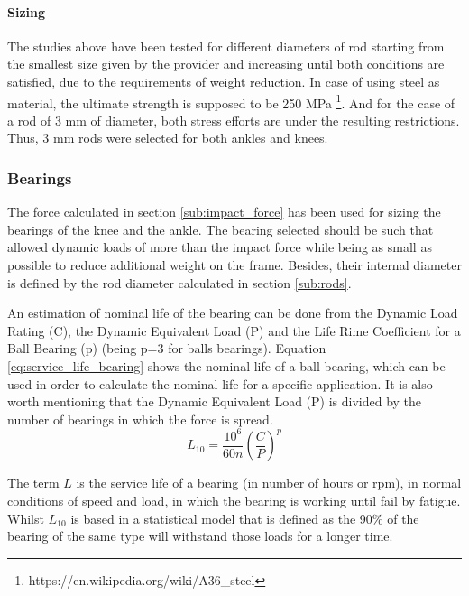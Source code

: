   \paragraph{Sizing} %
  \label{ssub:sizing}
  The studies above have been tested for different diameters of rod starting from the smallest size given by the provider and increasing until both conditions are satisfied, due to the requirements of weight reduction.
  In case of using steel as material, the ultimate strength is supposed to be 250 MPa \footnote{https://en.wikipedia.org/wiki/A36\_steel}.
  And for the case of a rod of 3 mm of diameter, both stress efforts are under the resulting restrictions.
  Thus, 3 mm rods were selected for both ankles and knees.

\subsubsection{Bearings} %
\label{ssub:bearings}
The force calculated in section \ref{sub:impact_force} has been used for sizing the bearings of the knee and the ankle.
The bearing selected should be such that allowed dynamic loads of more than the impact force while being as small as possible to reduce additional weight on the frame.
Besides, their internal diameter is defined by the rod diameter calculated in section \ref{sub:rods}.

An estimation of nominal life of the bearing can be done from the Dynamic Load Rating (C), the Dynamic Equivalent Load (P) and the Life Rime Coefficient for a Ball Bearing (p) (being p=3 for balls bearings).
Equation \ref{eq:service_life_bearing} shows the nominal life of a ball bearing, which can be used in order to calculate the nominal life for a specific application.
It is also worth mentioning that the Dynamic Equivalent Load (P) is divided by the number of bearings in which the force is spread.
\begin{equation}
  \label{eq:service_life_bearing}
  L_{10} = \frac{10^{6}}{60 n} \left(\frac{C}{P}\right)^{p}
\end{equation}

The term $L$ is the service life of a bearing (in number of hours or rpm), in normal conditions of speed and load, in which the bearing is working until fail by fatigue. 
Whilst $L_{10}$ is based in a statistical model that is defined as the 90\% of the bearing of the same type will withstand those loads for a longer time.

